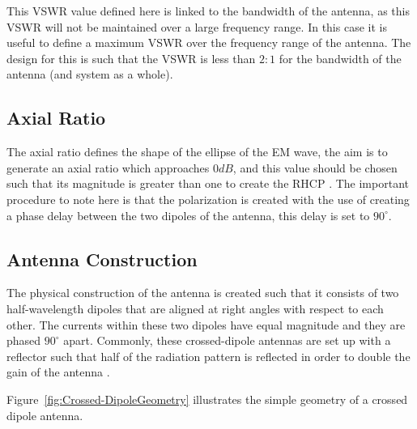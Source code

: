 \documentclass[11pt]{witseiepaper}
\begin{document}
This VSWR value defined here is linked to the bandwidth of the antenna, as this VSWR will not be maintained over a large frequency range. In this case it is useful to define a maximum VSWR over the frequency range of the antenna. The design for this is such that the VSWR is less than $2:1$ for the bandwidth of the antenna (and system as a whole).

\subsection{Axial Ratio} \label{sec:AxialRatio}
The axial ratio defines the shape of the ellipse of the EM wave, the aim is to generate an axial ratio which approaches $0 dB$, and this value should be chosen such that its magnitude is greater than one to create the RHCP \cite[p.~32]{crossedDipoleDesign}.
The important procedure to note here is that the polarization is created with the use of creating a phase delay between the two dipoles of the antenna, this delay is set to $90^{\circ}$. 


\subsection{Antenna Construction} \label{sec:AntennaConstruction}
The physical construction of the antenna is created such that it consists of two half-wavelength dipoles that are aligned at right angles with respect to each other. The currents within these two dipoles have equal magnitude and they are phased $90^{\circ}$ apart. 
Commonly, these crossed-dipole antennas are set up with a reflector such that half of the radiation pattern is reflected in order to double the gain of the antenna \cite[p.~108]{IEEECrossedDipole}. 

Figure~\ref{fig:Crossed-DipoleGeometry} illustrates the simple geometry of a crossed dipole antenna.
\end{document}
